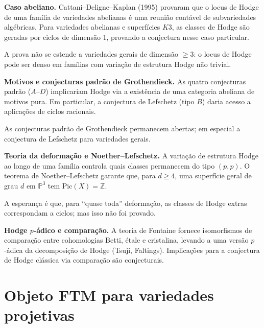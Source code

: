 \documentclass[11pt,a4paper]{article}
\begin{document}
\begin{programs}

\item \textbf{Caso abeliano.}
Cattani–Deligne–Kaplan (1995) provaram que o locus de Hodge de uma
família de variedades abelianas é uma reunião contável de subvariedades
algébricas. Para variedades abelianas e superfícies $K3$,
as classes de Hodge são geradas por ciclos de dimensão 1,
provando a conjectura nesse caso particular.

\begin{gap}
A prova não se estende a variedades gerais de dimensão $\ge3$:
o locus de Hodge pode ser denso em famílias com variação de
estrutura Hodge não trivial. \OPEN
\end{gap}

\item \textbf{Motivos e conjecturas padrão de Grothendieck.}
As quatro conjecturas padrão ($A$–$D$) implicariam Hodge via
a existência de uma categoria abeliana de motivos pura.
Em particular, a conjectura de Lefschetz (tipo $B$) daria
acesso a aplicações de ciclos racionais.

\begin{gap}
As conjecturas padrão de Grothendieck permanecem abertas;
em especial a conjectura de Lefschetz para variedades gerais. \OPEN
\end{gap}

\item \textbf{Teoria da deformação e Noether–Lefschetz.}
A variação de estrutura Hodge ao longo de uma família controla
quais classes permanecem do tipo $(p,p)$.
O teorema de Noether–Lefschetz garante que, para $d\ge4$,
uma superfície geral de grau $d$ em $\mathbb P^3$ tem
$\mathrm{Pic}(X)=\mathbb Z$.

A esperança é que, para ``quase toda'' deformação, as classes
de Hodge extras correspondam a ciclos; mas isso não foi provado.

\item \textbf{Hodge $p$-ádico e comparação.}
A teoria de Fontaine fornece isomorfismos de comparação entre
cohomologias Betti, étale e cristalina, levando a uma versão
$p$-ádica da decomposição de Hodge (Tsuji, Faltings).
Implicações para a conjectura de Hodge clássica via
comparação são conjecturais.

\end{programs}

\section{Objeto FTM para variedades projetivas}
\end{document}
